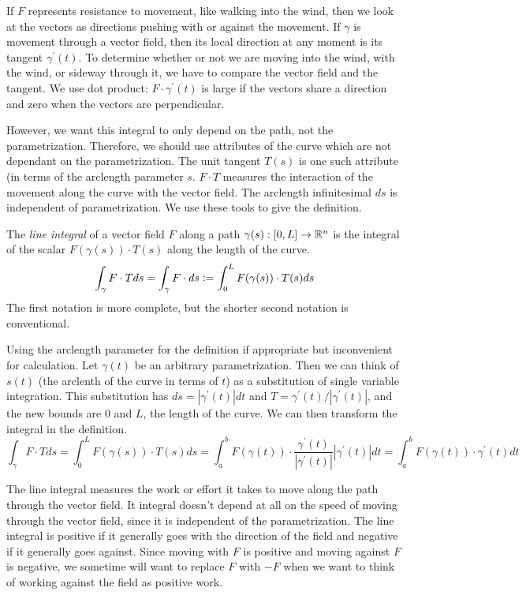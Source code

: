 \documentclass[fleqn,letterpaper]{report}
\begin{document}
If $F$ represents resistance to movement, like walking into
the wind, then we look at the vectors as directions pushing
with or against the movement. If $\gamma$ is movement through a
vector field, then its local direction at any moment is its
tangent $\gamma^\prime(t)$. To determine whether or not we
are moving into the wind, with the wind, or sideway through
it, we have to compare the vector field and the tangent.
We use dot product: $F \cdot \gamma^\prime(t)$ is large if the
vectors share a direction and zero when the vectors are
perpendicular.

However, we want this integral to only depend on the path, not
the parametrization. Therefore, we should use attributes of
the curve which are not dependant on the parametrization. The
unit tangent $T(s)$ is one such attribute (in terms of the
arclength parameter $s$. $F \cdot T$
measures the interaction of the movement along the curve with
the vector field. The arclength infinitesimal $ds$ is
independent of parametrization. We use these tools to give the
definition.

\begin{defn} 
The \emph{line integral} of a vector field $F$ along a path
$\gamma(s): [0,L] \rightarrow \mathbb{R}^n$ is the integral of the
scalar $F(\gamma(s)) \cdot T(s)$ along the length of the
curve.
\begin{equation*}
\int_{\gamma} F \cdot T ds = \int_{\gamma} F \cdot ds \mathrel{\mathop:}=
\int_0^L F(\gamma(s)) \cdot T(s) ds 
\end{equation*}
The first notation is more complete, but the shorter second
notation is conventional. 
\end{defn} 

Using the arclength parameter for the definition if
appropriate but inconvenient for calculation. 
Let $\gamma(t)$ be an arbitrary parametrization. Then we can
think of $s(t)$ (the arclenth of the curve in terms of $t$) as
a substitution of single variable integration. This
substitution has $ds = |\gamma^\prime(t)| dt$ and $T =
\gamma^\prime(t) / |\gamma^\prime(t)|$, and the new bounds are
$0$ and $L$, the length of the curve. We can then transform
the integral in the definition.
\begin{equation*}
\int_{\gamma} F \cdot T ds = \int_0^L F(\gamma(s)) \cdot T(s)
ds = \int_a^b F(\gamma(t)) \cdot
\frac{\gamma^\prime(t)}{|\gamma^\prime(t)|} |\gamma^\prime(t)|
dt = \int_a^b F(\gamma(t)) \cdot \gamma^\prime(t) dt 
\end{equation*}

The line integral measures the work or effort it takes to move
along the path through the vector field. It integral doesn't
depend at all on the speed of moving through the vector field,
since it is independent of the parametrization. The line
integral is positive if it generally goes with the direction
of the field and negative if it generally goes against. Since
moving with $F$ is positive and moving against $F$ is
negative, we sometime will want to replace $F$ with $-F$ when
we want to think of working against the field as positive work.
\end{document}
